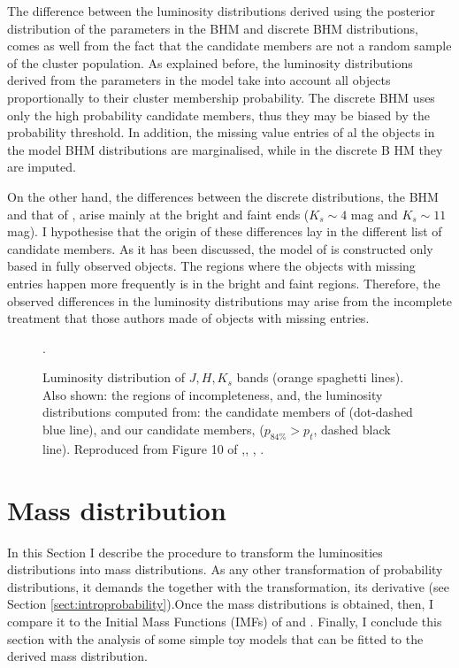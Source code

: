 The difference between the luminosity distributions derived using the posterior distribution of the parameters in the BHM and discrete BHM distributions, comes as well from the fact that the candidate members are not a random sample of the cluster population. As explained before, the luminosity distributions derived from the parameters in the model take into account all objects proportionally to their cluster membership probability. The discrete BHM uses only the high probability candidate members, thus they may be biased by the probability threshold. In addition, the missing value entries of al the objects in the model BHM distributions are marginalised, while in the discrete B
HM they are imputed.
 
On the other hand, the differences between the discrete distributions, the BHM and that of \citet{Bouy2015}, arise mainly at the bright and faint ends ($K_s\sim 4$ mag and $K_s\sim11$ mag). I hypothesise that the origin of these differences lay in the different list of candidate members. As it has been discussed, the model of \citet{Bouy2015} is constructed only based in fully observed objects. The regions where the objects with missing entries happen more frequently is in the bright and faint regions. Therefore, the observed differences in the luminosity distributions may arise from the incomplete treatment that those authors made of objects with missing entries.

\begin{figure}[htbp]
\begin{center}
\caption{Luminosity distribution of $J,H,K_s$ bands (orange spaghetti lines). Also shown: the regions of incompleteness, and, the luminosity distributions computed from: the candidate members of \citet{Bouy2015} (dot-dashed blue line), and our candidate members, ($p_{84\%}>p_t$, dashed black line). Reproduced from Figure 10 of \citet{Olivares2017},\textit{}, , .}
\label{fig:Luminosities}.
\end{center}
\end{figure}

\section{Mass distribution}

In this Section I describe the procedure to transform the luminosities distributions into mass distributions. As any other transformation of probability distributions, it demands the together with the transformation, its derivative (see Section \ref{sect:introprobability}).Once the mass distributions is obtained,  then, I compare it to the Initial Mass Functions (IMFs) of \citet{Chabrier2005} and \citet{Thies2007}. Finally, I conclude this section with the analysis of some simple toy models that can be fitted to the derived mass distribution.

